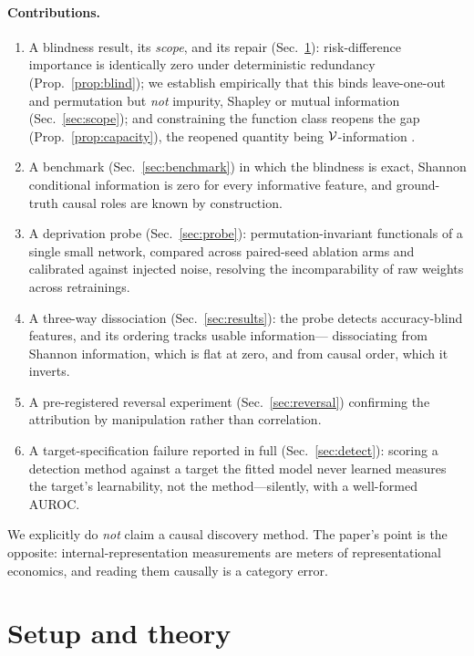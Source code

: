 \paragraph{Contributions.}
\begin{enumerate}\itemsep2pt
\item A blindness result, its \emph{scope}, and its repair
  (Sec.~\ref{sec:theory}): risk-difference importance is identically zero under
  deterministic redundancy (Prop.~\ref{prop:blind}); we establish empirically
  that this binds leave-one-out and permutation but \emph{not} impurity,
  Shapley or mutual information (Sec.~\ref{sec:scope}); and constraining the
  function class reopens the gap (Prop.~\ref{prop:capacity}), the reopened
  quantity being $\mathcal{V}$-information \citep{xu2020theory}.
\item A benchmark (Sec.~\ref{sec:benchmark}) in which the blindness is exact,
  Shannon conditional information is zero for every informative feature, and
  ground-truth causal roles are known by construction.
\item A deprivation probe (Sec.~\ref{sec:probe}): permutation-invariant
  functionals of a single small network, compared across paired-seed ablation
  arms and calibrated against injected noise, resolving the incomparability of
  raw weights across retrainings.
\item A three-way dissociation (Sec.~\ref{sec:results}): the probe detects
  accuracy-blind features, and its ordering tracks usable information---%
  dissociating from Shannon information, which is flat at zero, and from causal
  order, which it inverts.
\item A pre-registered reversal experiment (Sec.~\ref{sec:reversal}) confirming
  the attribution by manipulation rather than correlation.
\item A target-specification failure reported in full (Sec.~\ref{sec:detect}):
  scoring a detection method against a target the fitted model never learned
  measures the target's learnability, not the method---silently, with a
  well-formed AUROC.
\end{enumerate}

We explicitly do \emph{not} claim a causal discovery method. The paper's point
is the opposite: internal-representation measurements are meters of
representational economics, and reading them causally is a category error.

\section{Setup and theory}\label{sec:theory}


